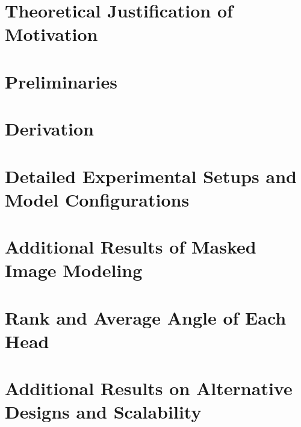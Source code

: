 



\newpage
\appendix
\section{Theoretical Justification of Motivation}
\label{section:justification}



\section{Preliminaries}
\label{section:preliminaries}



\section{Derivation}
\label{appendix:derivation}



\section{Detailed Experimental Setups and Model Configurations}
\label{section:detailed experimental setup}



\section{Additional Results of Masked Image Modeling}
\label{section:additional results of masked image modeling}



\section{Rank and Average Angle of Each Head}
\label{section:rank angle sudoku cifar10 complete}



\section{Additional Results on Alternative Designs and Scalability}
\label{section:alternative designs and scalability}

